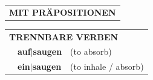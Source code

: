 \documentclass[10pt,a4paper]{revtex4-2}
\begin{document}
\begin{verbbox-acc}
\vspace{10pt}

\begin{tabular}{lll}
\multicolumn{3}{l}{\textbf{MIT PRÄPOSITIONEN}}\\
\end{tabular}
\hfill
\begin{tabular}{lll}
\multicolumn{3}{l}{\textbf{TRENNBARE VERBEN}}\\
& \textbf{auf$|$saugen} & (to absorb)\\
& \textbf{ein$|$saugen} & (to inhale / absorb)\\
\end{tabular}

\vspace{-5pt}
\end{verbbox-acc}
\end{document}
